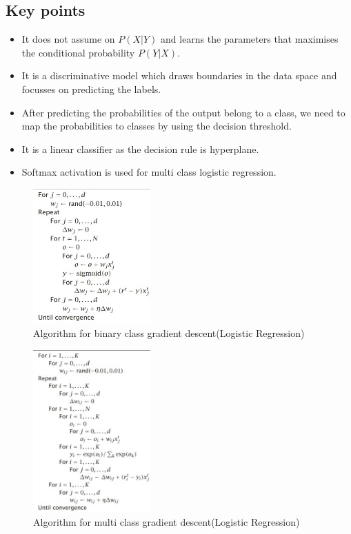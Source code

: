 \documentclass[12pt,letterpaper, onecolumn]{exam}
\begin{document}
\subsection*{Key points}
\begin{itemize}
\item It does not assume on $P(X|Y)$ and learns the parameters that maximises the conditional probability $P(Y|X)$.
\item It is a discriminative model which draws boundaries in the data space and focusses on predicting the labels.
\item After predicting the probabilities of the output belong to a class, we need to map the probabilities to classes by using the decision threshold.
\item It is a linear classifier as the decision rule is hyperplane.
\item Softmax activation is used for multi class logistic regression.
\end{itemize}

\begin{figure}[!h]
\caption{Algorithm for binary class gradient descent(Logistic Regression)}
\centering
\includegraphics[width = 0.4\textwidth]{../images/logi_grad.jpg}
\end{figure}
\begin{figure}[!h]
\caption{Algorithm for multi class gradient descent(Logistic Regression)}
\centering
\includegraphics[width = 0.4\textwidth]{../images/logi_gradm.jpg}
\end{figure}
\end{document}
